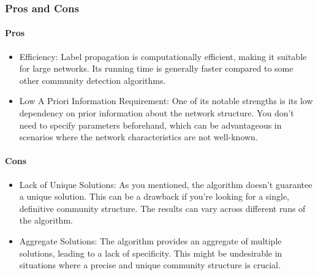 \subsubsection{Pros and Cons}
\paragraph{Pros}
\begin{itemize}
    \item Efficiency: Label propagation is computationally efficient, making it suitable for large networks. Its running time is generally faster compared to some other community detection algorithms.
    \item Low A Priori Information Requirement: One of its notable strengths is its low dependency on prior information about the network structure. You don't need to specify parameters beforehand, which can be advantageous in scenarios where the network characteristics are not well-known.
\end{itemize}
\paragraph{Cons}
\begin{itemize}
    \item Lack of Unique Solutions: As you mentioned, the algorithm doesn't guarantee a unique solution. This can be a drawback if you're looking for a single, definitive community structure. The results can vary across different runs of the algorithm.
    \item Aggregate Solutions: The algorithm provides an aggregate of multiple solutions, leading to a lack of specificity. This might be undesirable in situations where a precise and unique community structure is crucial.
\end{itemize}

